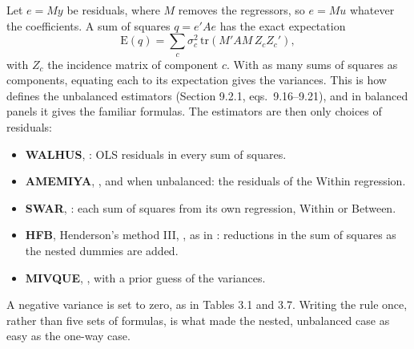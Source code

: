 Let $e = My$ be residuals, where $M$ removes the regressors, so $e = Mu$ whatever the coefficients. A sum of squares
$q = e'Ae$ has the exact expectation
\[ \mathrm{E}(q) = \textstyle\sum_c \sigma_c^2 \,\mathrm{tr}(M'AM\,Z_cZ_c'), \]
with $Z_c$ the incidence matrix of component $c$. With as many sums of squares as components, equating each to its
expectation gives the variances. This is how  defines the unbalanced estimators (Section 9.2.1, eqs.\ 9.16--9.21),
and in balanced panels it gives the familiar formulas. The estimators are then only choices of residuals:
\begin{itemize}
  \item \textbf{WALHUS}, : OLS residuals in every sum of squares.
  \item \textbf{AMEMIYA}, , and  when unbalanced: the residuals of the Within regression.
  \item \textbf{SWAR}, : each sum of squares from its own regression, Within or Between.
  \item \textbf{HFB}, Henderson's method III, , as in : reductions in the sum of squares as the nested dummies are added.
  \item \textbf{MIVQUE}, , with a prior guess of the variances.
\end{itemize}
A negative variance is set to zero, as in Tables 3.1 and 3.7. Writing the rule once, rather than five sets of formulas,
is what made the nested, unbalanced case as easy as the one-way case.

